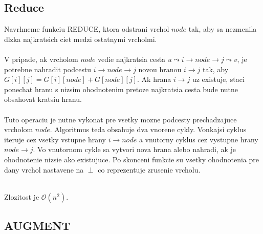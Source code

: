 \documentclass[paper=a4, fontsize=11pt]{scrartcl} %
\numberwithin{equation}{section} %
\numberwithin{figure}{section} %
\numberwithin{table}{section} %
\begin{document}
\subsection*{Reduce}

Navrhneme funkciu REDUCE, ktora odstrani vrchol $node$ tak, aby sa nezmenila dlzka najkratsich ciet medzi ostatnymi vrcholmi.\\
\ \\
V pripade, ak vrcholom $node$ vedie najkratsia cesta $u \leadsto i \to node \to j \leadsto v$, je potrebne nahradit podcestu $i \to node \to j$ novou hranou $i \to j$ tak, aby $G[i][j] = G[i][node] + G[node][j]$. Ak hrana $i \to j$ uz existuje, staci ponechat hranu s nizsim ohodnotenim pretoze najkratsia cesta bude nutne obsahovat kratsiu hranu.\\
\ \\
Tuto operaciu je nutne vykonat pre vsetky mozne podcesty prechadzajuce vrcholom $node$. Algoritmus teda obsahuje dva vnorene cykly. Vonkajsi cyklus iteruje cez vsetky vstupne hrany $i \to node$ a vnutorny cyklus cez vystupne hrany $node \to j$. Vo vnutornom cykle sa vytvori nova hrana alebo nahradi, ak je ohodnotenie nizsie ako existujuce. Po skonceni funkcie su vsetky ohodnotenia pre dany vrchol nastavene na $\perp$ co reprezentuje zrusenie vrcholu.\\
\ \\
\begin{algorithmic}[1]
                       \EndIf
                   \EndIf
                \EndFor                
            \EndIf            
        \EndFor
       \EndFor
        \State {}
    \EndFunction
\end{algorithmic}

Zlozitost je $\mathcal{O}(n^2)$.

\subsection*{AUGMENT}
\end{document}
